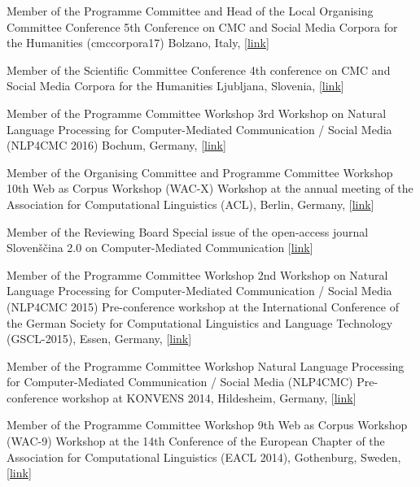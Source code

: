 
        {Member of the Programme Committee and Head of the Local Organising Committee}
        {Conference}
        {5th Conference on CMC and Social Media Corpora for the Humanities (cmccorpora17)}
        {Bolzano, Italy, [\href{https://cmc-corpora2017.eurac.edu}{link}]}
        {}

        {Member of the Scientific Committee}
        {Conference}
        {4th conference on CMC and Social Media Corpora for the Humanities}
        {Ljubljana, Slovenia, [\href{http://nl.ijs.si/janes/cmc-corpora2016/}{link}]}
        {}

        {Member of the Programme Committee}
        {Workshop}
        {3rd Workshop on Natural Language Processing for Computer-Mediated Communication /
        Social Media (NLP4CMC 2016)}
        {Bochum, Germany, [\href{https://sites.google.com/site/nlp4cmc2016/}{link}]}
        {}

        {Member of the Organising Committee and Programme Committee}
        {Workshop}
        {10th Web as Corpus Workshop (WAC-X)}
        {Workshop at the annual meeting of the Association for Computational
        Linguistics (ACL), Berlin, Germany,
        [\href{https://www.sigwac.org.uk/wiki/WAC-X}{link}]}
        {}

        {Member of the Reviewing Board} 
        {Special issue of the open-access
         journal Slovenščina 2.0 on Computer-Mediated Communication}
        {} 
        {[\href{http://www.trojina.org/slovenscina2.0/en/}{link}]}
        {}

        {Member of the Programme Committee}
        {Workshop}
        {2nd Workshop on Natural Language Processing for Computer-Mediated Communication /
        Social Media (NLP4CMC 2015)}
        {Pre-conference workshop at the International Conference of the German
        Society for Computational Linguistics and Language Technology
        (GSCL-2015), Essen, Germany, [\href{https://sites.google.com/site/nlp4cmc2015/}{link}]}
        {}

        {Member of the Programme Committee}
        {Workshop}
        {Natural Language Processing for Computer-Mediated Communication /
        Social Media (NLP4CMC)}
        {Pre-conference workshop at KONVENS 2014, Hildesheim, Germany,
        [\href{https://sites.google.com/site/nlp4cmc/}{link}]}
        {}

        {Member of the Programme Committee}
        {Workshop}
        {9th Web as Corpus Workshop (WAC-9)}
        {Workshop at the 14th Conference of the European Chapter of the
        Association for Computational Linguistics (EACL 2014), Gothenburg,
        Sweden, [\href{https://sigwac.org.uk/wiki/WAC9}{link}]}
        {}

